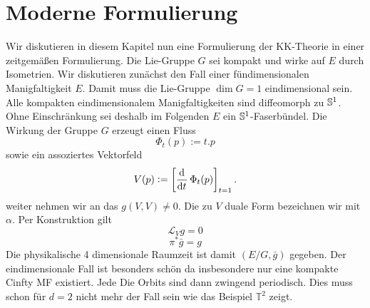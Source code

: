 \chapter{Moderne Formulierung}
Wir diskutieren in diesem Kapitel nun eine Formulierung der KK-Theorie in 
einer zeitgemäßen Formulierung. Die Lie-Gruppe $G$ sei kompakt und wirke auf
$E$ durch Isometrien. Wir diskutieren zunächst den Fall einer fündimensionalen
Manigfaltigkeit $E$.
Damit muss die Lie-Gruppe $\dim G=1$ eindimensional sein. Alle kompakten
eindimensionalem Manigfaltigkeiten sind diffeomorph zu $\mathbb{S}^1$. Ohne
Einschränkung sei deshalb im Folgenden $E$ ein $\mathbb{S}^1$-Faserbündel.
Die Wirkung der Gruppe $G$ erzeugt einen Fluss 
\begin{equation}
\Phi_t(p):=t.p
\end{equation}
sowie ein assoziertes Vektorfeld 
\begin{equation}
V(p):=\left[\dod{}{t}\Phi_t(p)\right]_{t=1}\,.
\end{equation}
weiter nehmen wir an das $g(V,V)\neq 0$. 
Die zu $V$ duale Form bezeichnen wir mit $\alpha$. 
Per Konstruktion gilt
\begin{equation}
\mathcal{L}_{V}g=0
\end{equation}
\begin{equation}
\pi^*\bar{g}=g
\end{equation}
Die physikalische 4 dimensionale Raumzeit ist damit $(E/G,\bar{g})$ gegeben.
Der eindimensionale Fall ist besonders schön da insbesondere nur eine kompakte 
Cinfty MF existiert. Jede Die Orbits sind dann zwingend periodisch. Dies muss 
schon für $d=2$ nicht mehr der Fall sein wie das Beispiel $\mathbb{T}^2$ zeigt.
